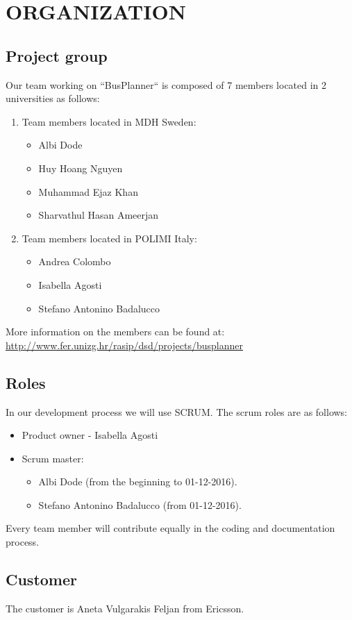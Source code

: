 \section{ORGANIZATION}
\subsection{Project group}
Our team working on “BusPlanner“ is composed of 7 members located in 2 universities as follows:
\begin{enumerate}
	\item Team members located in MDH Sweden:
	\begin{itemize}
		\item Albi Dode
		\item Huy Hoang Nguyen
		\item Muhammad Ejaz Khan
		\item Sharvathul Hasan Ameerjan	
	\end{itemize}
	\item Team members located in POLIMI Italy:
	\begin{itemize}
		\item Andrea Colombo
		\item Isabella Agosti
		\item Stefano Antonino Badalucco	
	\end{itemize}
\end{enumerate}
More information on the members can be found at: \\
\url{http://www.fer.unizg.hr/rasip/dsd/projects/busplanner}
\subsection{Roles}
In our development process we will use SCRUM. The scrum roles are as follows:
\begin{itemize}
	\item Product owner - Isabella Agosti
	\item Scrum master:
	\begin{itemize}
		\item Albi Dode (from the beginning to 01-12-2016).
		\item Stefano Antonino Badalucco (from 01-12-2016).
	\end{itemize}
\end{itemize}
Every team member will contribute equally in the coding and documentation process.
\subsection{Customer}
The customer is Aneta Vulgarakis Feljan from Ericsson.
